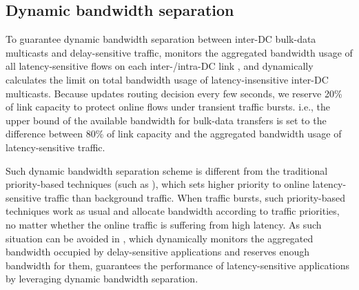 \subsection{Dynamic bandwidth separation}
\label{subsec:system:separation}


To guarantee dynamic bandwidth separation between inter-DC 
bulk-data multicasts and delay-sensitive traffic, \name 
monitors the aggregated bandwidth usage of all 
latency-sensitive flows on each inter-/intra-DC link
, and dynamically 
calculates the limit on total bandwidth usage of 
latency-insensitive inter-DC multicasts.
Because \name updates routing decision every few seconds,
we reserve 20\% of link capacity to protect online flows 
under transient traffic bursts.
i.e., the upper bound of the available bandwidth for bulk-data 
transfers is set to the difference between 80\% of 
link capacity and the aggregated bandwidth usage of 
latency-sensitive traffic. 

Such dynamic bandwidth separation scheme is different from the traditional priority-based techniques (such as \cite{kumar2015bwe}), which sets higher priority to online latency-sensitive traffic than background traffic. When traffic bursts, such priority-based techniques work as usual and allocate bandwidth according to traffic priorities, no matter whether the online traffic is suffering from high latency. As such situation can be avoided in \name, which dynamically monitors the aggregated bandwidth occupied by delay-sensitive applications and reserves enough bandwidth for them, \name guarantees the performance of latency-sensitive applications by leveraging dynamic bandwidth separation.

